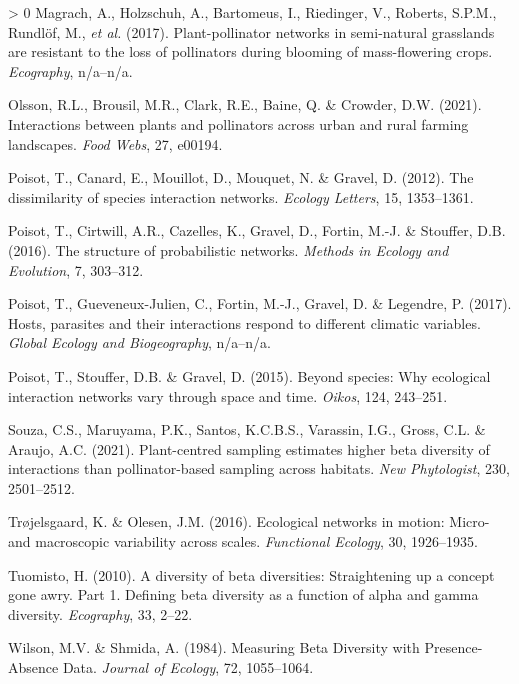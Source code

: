 \documentclass[10pt,oneside]{article}
\newlength{\cslhangindent}
\newenvironment{CSLReferences}[3] %
 {%
  \setlength{\parindent}{0pt}
  \ifodd #1 \everypar{\setlength{\hangindent}{\cslhangindent}}\ignorespaces\fi
  \ifnum #2 > 0
  \setlength{\parskip}{#2\baselineskip}
  \fi
 }%
 {}
\begin{document}
\begin{CSLReferences}{1}{0}
\leavevmode\hypertarget{ref-Magrach2017PlaNet}{}%
Magrach, A., Holzschuh, A., Bartomeus, I., Riedinger, V., Roberts,
S.P.M., Rundlöf, M., \emph{et al.} (2017). Plant-pollinator networks in
semi-natural grasslands are resistant to the loss of pollinators during
blooming of mass-flowering crops. \emph{Ecography}, n/a--n/a.

\leavevmode\hypertarget{ref-Olsson2021IntPla}{}%
Olsson, R.L., Brousil, M.R., Clark, R.E., Baine, Q. \& Crowder, D.W.
(2021). Interactions between plants and pollinators across urban and
rural farming landscapes. \emph{Food Webs}, 27, e00194.

\leavevmode\hypertarget{ref-Poisot2012DisSpe}{}%
Poisot, T., Canard, E., Mouillot, D., Mouquet, N. \& Gravel, D. (2012).
The dissimilarity of species interaction networks. \emph{Ecology
Letters}, 15, 1353--1361.

\leavevmode\hypertarget{ref-Poisot2016StrPro}{}%
Poisot, T., Cirtwill, A.R., Cazelles, K., Gravel, D., Fortin, M.-J. \&
Stouffer, D.B. (2016). The structure of probabilistic networks.
\emph{Methods in Ecology and Evolution}, 7, 303--312.

\leavevmode\hypertarget{ref-Poisot2017HosPar}{}%
Poisot, T., Gueveneux-Julien, C., Fortin, M.-J., Gravel, D. \& Legendre,
P. (2017). Hosts, parasites and their interactions respond to different
climatic variables. \emph{Global Ecology and Biogeography}, n/a--n/a.

\leavevmode\hypertarget{ref-Poisot2015SpeWhy}{}%
Poisot, T., Stouffer, D.B. \& Gravel, D. (2015). Beyond species: Why
ecological interaction networks vary through space and time.
\emph{Oikos}, 124, 243--251.

\leavevmode\hypertarget{ref-Souza2021PlaSam}{}%
Souza, C.S., Maruyama, P.K., Santos, K.C.B.S., Varassin, I.G., Gross,
C.L. \& Araujo, A.C. (2021). Plant-centred sampling estimates higher
beta diversity of interactions than pollinator-based sampling across
habitats. \emph{New Phytologist}, 230, 2501--2512.

\leavevmode\hypertarget{ref-Trojelsgaard2016EcoNet}{}%
Trøjelsgaard, K. \& Olesen, J.M. (2016). Ecological networks in motion:
Micro- and macroscopic variability across scales. \emph{Functional
Ecology}, 30, 1926--1935.

\leavevmode\hypertarget{ref-Tuomisto2010DivBet}{}%
Tuomisto, H. (2010). A diversity of beta diversities: Straightening up a
concept gone awry. Part 1. Defining beta diversity as a function of
alpha and gamma diversity. \emph{Ecography}, 33, 2--22.

\leavevmode\hypertarget{ref-Wilson1984MeaBet}{}%
Wilson, M.V. \& Shmida, A. (1984). Measuring Beta Diversity with
Presence-Absence Data. \emph{Journal of Ecology}, 72, 1055--1064.

\end{CSLReferences}
\end{document}
